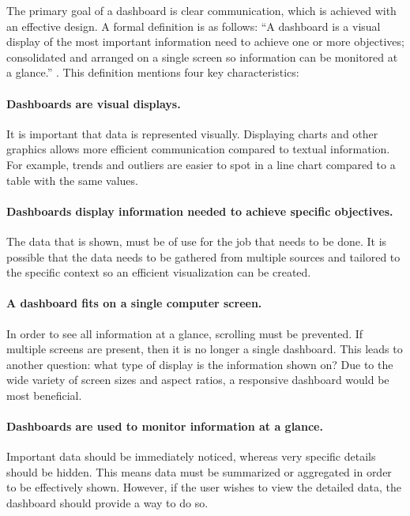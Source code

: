     The primary goal of a dashboard is clear communication, which is achieved with an effective design. A formal definition is as follows: ``A dashboard is a visual display of the most important information need to achieve one or more objectives; consolidated and arranged on a single screen so information can be monitored at a glance.'' \cite{dashboard}. This definition mentions four key characteristics:

    \paragraph{Dashboards are visual displays.} It is important that data is represented visually. Displaying charts and other graphics allows more efficient communication compared to textual information. For example, trends and outliers are easier to spot in a line chart compared to a table with the same values.

    \paragraph{Dashboards display information needed to achieve specific objectives.} The data that is shown, must be of use for the job that needs to be done. It is possible that the data needs to be gathered from multiple sources and tailored to the specific context so an efficient visualization can be created.

    \paragraph{A dashboard fits on a single computer screen.} In order to see all information at a glance, scrolling must be prevented. If multiple screens are present, then it is no longer a single dashboard. This leads to another question: what type of display is the information shown on? Due to the wide variety of screen sizes and aspect ratios, a responsive dashboard would be most beneficial.

    \paragraph{Dashboards are used to monitor information at a glance.} Important data should be immediately noticed, whereas very specific details should be hidden. This means data must be summarized or aggregated in order to be effectively shown. However, if the user wishes to view the detailed data, the dashboard should provide a way to do so.\\

